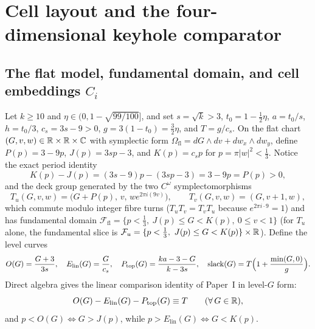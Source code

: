 \section{Cell layout and the four-dimensional keyhole comparator}\label{sec:cmp-4d}

\subsection{The flat model, fundamental domain, and cell embeddings $C_i$}\label{sec:cmp-cells}

Let $k\ge10$ and $\eta\in(0,1-\sqrt{99/100}]$, and set $s=\sqrt k>3$, $t_0=1-\frac12\eta$, $a=t_0/s$, $h=t_0/3$,
$c_s=3s-9>0$, $g=3(1-t_0)=\frac32\eta$, and $T=g/c_s$. On the flat chart $(G,v,w)\in\mathbb{R}\times\mathbb{R}\times\mathbb{C}$ with symplectic
form $\Omega_{\mathrm{fl}}=dG\wedge dv+dw_x\wedge dw_y$, define $P(p)=3-9p$, $J(p)=3sp-3$, and $K(p)=c_sp$ for
$p=\pi|w|^2<\frac13$. Notice the exact period identity
\begin{equation}\label{eq:JK-period}
 K(p)-J(p) = (3s-9)p - (3sp-3) = 3-9p = P(p) > 0,
\end{equation}
and the deck group generated by the two $C^\omega$ symplectomorphisms
\[
 T_u(G,v,w)=\bigl(G+P(p),\,v,\,we^{2\pi i(9v)}\bigr),\qquad T_v(G,v,w)=(G,v+1,w),
\]
which commute modulo integer fibre turns ($T_uT_v=T_vT_u$ because $e^{2\pi i\cdot9}=1$) and has fundamental domain
$\mathcal F_{\mathrm{fl}}=\{p<\frac13,\ J(p)\le G<K(p),\ 0\le v<1\}$ (for $T_u$ alone, the fundamental slice is
$\mathcal F_u=\{p<\frac13,\ J(p)\le G<K(p)\}\times\mathbb{R}$). Define the level curves
\[
 O(G)=\frac{G+3}{3s},\quad E_{\mathrm{lin}}(G)=\frac{G}{c_s},\quad
 P_{\mathrm{top}}(G)=\frac{ka-3-G}{k-3s},\quad \operatorname{slack}(G)=T\Bigl(1+\frac{\min(G,0)}{g}\Bigr).
\]
Direct algebra gives the linear comparison identity of Paper~I in level-$G$ form:
\begin{equation}\label{eq:level-G-id}
 O(G)-E_{\mathrm{lin}}(G)-P_{\mathrm{top}}(G) \equiv T \qquad(\forall\,G\in\mathbb{R}),
\end{equation}
and $p<O(G)\iff G>J(p)$, while $p>E_{\mathrm{lin}}(G)\iff G<K(p)$.

